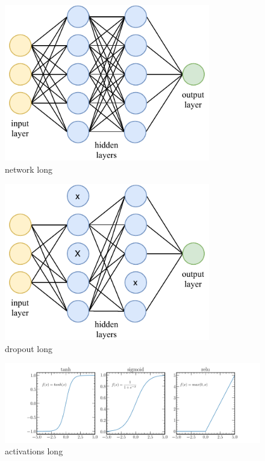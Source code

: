 \begin{figure} %
    \includegraphics[width=0.8\textwidth]{diagrams/7-cvn/network.pdf}
    \caption[network short]
    {network long}
    \label{fig:network}
\end{figure} %

\begin{figure} %
    \includegraphics[width=0.8\textwidth]{diagrams/7-cvn/dropout.pdf}
    \caption[dropout short]
    {dropout long}
    \label{fig:dropout}
\end{figure} %

\begin{figure} %
    \includegraphics[width=\textwidth]{diagrams/7-cvn/activations.pdf}
    \caption[activations short]
    {activations long}
    \label{fig:activations}
\end{figure} %

